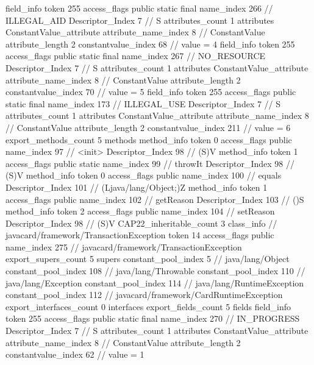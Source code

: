 {{{{{{{				}
				}
			}
			field_info {
				token	255
				access_flags	public static final
				name_index	266		// ILLEGAL_AID
				Descriptor_Index	7		// S
				attributes_count	1
				attributes {
				ConstantValue_attribute {
					attribute_name_index	8		// ConstantValue
					attribute_length	2
					constantvalue_index	68		// value = 4
				}
				}
			}
			field_info {
				token	255
				access_flags	public static final
				name_index	267		// NO_RESOURCE
				Descriptor_Index	7		// S
				attributes_count	1
				attributes {
				ConstantValue_attribute {
					attribute_name_index	8		// ConstantValue
					attribute_length	2
					constantvalue_index	70		// value = 5
				}
				}
			}
			field_info {
				token	255
				access_flags	public static final
				name_index	173		// ILLEGAL_USE
				Descriptor_Index	7		// S
				attributes_count	1
				attributes {
				ConstantValue_attribute {
					attribute_name_index	8		// ConstantValue
					attribute_length	2
					constantvalue_index	211		// value = 6
				}
				}
			}
			}
			export_methods_count	5
			methods {
				method_info {
					token	0
					access_flags	public
					name_index	97		// <init>
					Descriptor_Index	98		// (S)V
				}
				method_info {
					token	1
					access_flags	public static
					name_index	99		// throwIt
					Descriptor_Index	98		// (S)V
				}
				method_info {
					token	0
					access_flags	public
					name_index	100		// equals
					Descriptor_Index	101		// (Ljava/lang/Object;)Z
				}
				method_info {
					token	1
					access_flags	public
					name_index	102		// getReason
					Descriptor_Index	103		// ()S
				}
				method_info {
					token	2
					access_flags	public
					name_index	104		// setReason
					Descriptor_Index	98		// (S)V
				}
			}
			CAP22_inheritable_count	3
		}
		class_info {		// javacard/framework/TransactionException
			token	14
			access_flags	public
			name_index	275		// javacard/framework/TransactionException
			export_supers_count	5
			supers {
				constant_pool_index	5		// java/lang/Object
				constant_pool_index	108		// java/lang/Throwable
				constant_pool_index	110		// java/lang/Exception
				constant_pool_index	114		// java/lang/RuntimeException
				constant_pool_index	112		// javacard/framework/CardRuntimeException
			}
			export_interfaces_count	0
			interfaces {
			}
			export_fields_count	5
			fields {
			field_info {
				token	255
				access_flags	public static final
				name_index	270		// IN_PROGRESS
				Descriptor_Index	7		// S
				attributes_count	1
				attributes {
				ConstantValue_attribute {
					attribute_name_index	8		// ConstantValue
					attribute_length	2
					constantvalue_index	62		// value = 1
}}}}}}}
